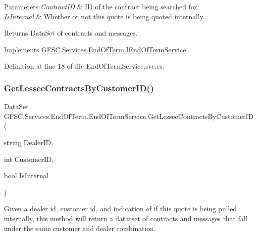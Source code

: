 \begin{DoxyParams}{Parameters}
{\em Contract\+ID} & ID of the contract being searched for.\\
\hline
{\em Is\+Internal} & Whether or not this quote is being quoted internally.\\
\hline
\end{DoxyParams}
\begin{DoxyReturn}{Returns}
Data\+Set of contracts and messages.
\end{DoxyReturn}


Implements \mbox{\hyperlink{interface_g_f_s_c_1_1_services_1_1_end_of_term_1_1_i_end_of_term_service_a239cda4fde97fcc9ffb96430790f20cb}{G\+F\+S\+C.\+Services.\+End\+Of\+Term.\+I\+End\+Of\+Term\+Service}}.



Definition at line 18 of file End\+Of\+Term\+Service.\+svc.\+cs.

\mbox{\label{class_g_f_s_c_1_1_services_1_1_end_of_term_1_1_end_of_term_service_add17d8f7568bbfa3531858e0fe044d04}} 
\subsubsection{\texorpdfstring{Get\+Lessee\+Contracts\+By\+Customer\+I\+D()}{GetLesseeContractsByCustomerID()}}
{\footnotesize\ttfamily Data\+Set G\+F\+S\+C.\+Services.\+End\+Of\+Term.\+End\+Of\+Term\+Service.\+Get\+Lessee\+Contracts\+By\+Customer\+ID (\begin{DoxyParamCaption}\item[{string}]{Dealer\+ID,  }\item[{int}]{Customer\+ID,  }\item[{bool}]{Is\+Internal }\end{DoxyParamCaption})}



Given a dealer id, customer id, and indication of if this quote is being pulled internally, this method will return a datatset of contracts and messages that fall under the same customer and dealer combination. 


